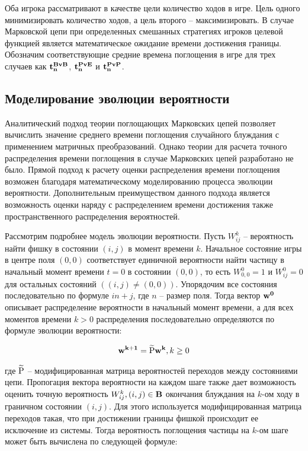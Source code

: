 Оба игрока рассматривают в качестве цели количество ходов в игре. Цель одного минимизировать количество ходов, а цель второго -- максимизировать.
В случае Марковской цепи при определенных смешанных стратегиях игроков целевой функцией является математическое ожидание времени достижения границы.
Обозначим соответствующие средние времена поглощения в игре для трех случаев как ${\bf t_n^{BvB}}$, ${\bf t_n^{PvE}}$ и ${\bf t_n^{PvP}}$.

\subsection{Моделирование эволюции вероятности}\label{subsec:ch1/sec3/sub3}

Аналитический подход теории поглощающих Марковских цепей позволяет вычислить значение среднего времени поглощения случайного блуждания
с применением матричных преобразований. Однако теории для расчета точного распределения времени поглощения в случае Марковских цепей
разработано не было. Прямой подход к расчету оценки распределения времени поглощения возможен благодаря математическому моделированию процесса 
эволюции вероятности. Дополнительным преимуществом данного подхода является возможность оценки наряду с распределением времени достижения также 
пространственного распределения вероятностей. 

Рассмотрим подробнее модель эволюции вероятности. Пусть $W_{ij}^{k}$ -- вероятность найти фишку в состоянии $(i, j)$ в момент времени $k$.
Начальное состояние игры в центре поля $(0, 0)$ соответствует единичной вероятности найти частицу в начальный момент времени $t=0$ в состоянии $(0, 0)$,
то есть $W_{0,0}^{0}=1$ и $W_{ij}^{0}=0$ для остальных состояний $((i, j) \neq (0, 0))$. Упорядочим все состояния последовательно по формуле $in + j$, где $n$ -- размер поля.
Тогда вектор ${\bf w^{0}}$ описывает распределение вероятности в начальный момент времени, а для всех моментов времени $k > 0$ 
распределения последовательно определяются по формуле эволюции вероятности:

\begin{equation}
    \begin{aligned}
    {\bf w^{k+1}}={\rm \widetilde{P}}{\bf w^{k}}, k \geq 0
    \label{eq:evolution}
    \end{aligned}
\end{equation}

где ${\rm \widetilde{P}}$ -- модифицированная матрица вероятностей переходов между состояниями цепи. 
Пропогация вектора вероятности на каждом шаге также дает возможность оценить точную вероятность $W_{ij}^{k}, (i, j) \in {\bf B}$ окончания блуждания на $k$-ом ходу
в граничном состоянии $(i, j)$. Для этого используется модифицированная матрица переходов такая, что при достижении границы фишкой 
происходит ее исключение из системы. Тогда вероятность поглощения частицы на $k$-ом шаге может быть вычислена по следующей формуле:

